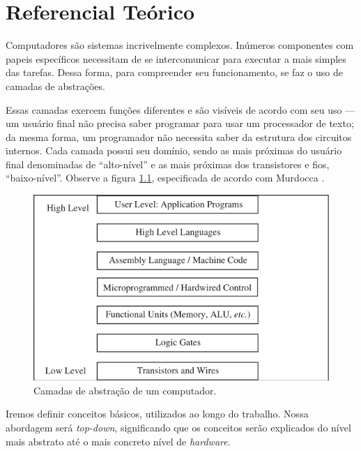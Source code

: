 
\chapter{Referencial Teórico}


Computadores são sistemas incrivelmente complexos. Inúmeros componentes com
papeis específicos necessitam de se intercomunicar para executar a mais simples
das tarefas. Dessa forma, para compreender seu funcionamento, se faz o uso de
camadas de abstrações.

Essas camadas exercem funções diferentes e são visíveis de acordo com seu uso
--- um usuário final não precisa saber programar para usar um processador de
texto; da mesma forma, um programador não necessita saber da estrutura dos
circuitos internos. Cada camada possui seu domínio, sendo as mais próximas do
usuário final denominadas de ``alto-nível'' e as mais próximas dos transistores
e fios, ``baixo-nível''. Observe a figura \ref{camadas}, especificada de acordo
com Murdocca \cite{principles}.

\begin{figure}[ptb]
  \begin{center}
    \includegraphics[scale=.6]{imagens/1_camadas}
  \end{center}
  \caption{Camadas de abstração de um computador.}
  \label{camadas}
\end{figure}

Iremos definir conceitos básicos, utilizados ao longo do trabalho. Nossa
abordagem será \textit{top-down}, significando que os conceitos serão explicados
do nível mais abstrato até o mais concreto nível de \textit{hardware}.

